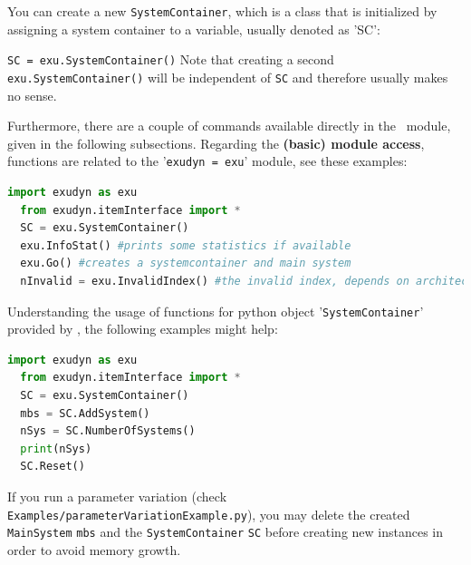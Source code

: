 \documentclass[11pt,a4paper]{book}
\begin{document}
You can create a new \texttt{SystemContainer}, which is a class that is initialized by assigning a system container to a variable, usually denoted as 'SC':
\bi
  \item[] \texttt{SC = exu.SystemContainer()}
\ei
Note that creating a second \texttt{exu.SystemContainer()} will be independent of \texttt{SC} and therefore usually makes no sense.

Furthermore, there are a couple of commands available directly in the \codeName\ module, given in the following subsections.
Regarding the {\bf (basic) module access}, functions are related to the '\texttt{exudyn = exu}' module, see these examples:
\begin{lstlisting}[language=Python, firstnumber=14]
  import exudyn as exu
  from exudyn.itemInterface import *
  SC = exu.SystemContainer()
  exu.InfoStat() #prints some statistics if available
  exu.Go() #creates a systemcontainer and main system
  nInvalid = exu.InvalidIndex() #the invalid index, depends on architecture and version
\end{lstlisting} \vspace{12pt}

Understanding the usage of functions for python object '\texttt{SystemContainer}' provided by \codeName, the following examples might help:
\begin{lstlisting}[language=Python, firstnumber=14]
  import exudyn as exu
  from exudyn.itemInterface import *
  SC = exu.SystemContainer()
  mbs = SC.AddSystem()
  nSys = SC.NumberOfSystems()
  print(nSys)
  SC.Reset()
\end{lstlisting} \vspace{12pt}
%
If you run a parameter variation (check \texttt{Examples/parameterVariationExample.py}), you may delete the created \texttt{MainSystem} \texttt{mbs} and the \texttt{SystemContainer} \texttt{SC} before creating new instances in order to avoid memory growth.
\end{document}
